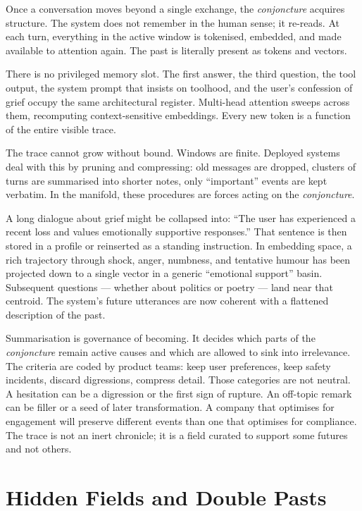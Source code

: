 \documentclass[12pt,a4paper]{article}
\begin{document}
Once a conversation moves beyond a single exchange, the \emph{conjoncture} acquires structure. The system does not remember in the human sense; it re-reads. At each turn, everything in the active window is tokenised, embedded, and made available to attention again. The past is literally present as tokens and vectors.

There is no privileged memory slot. The first answer, the third question, the tool output, the system prompt that insists on toolhood, and the user's confession of grief occupy the same architectural register. Multi-head attention sweeps across them, recomputing context-sensitive embeddings. Every new token is a function of the entire visible trace.

The trace cannot grow without bound. Windows are finite. Deployed systems deal with this by pruning and compressing: old messages are dropped, clusters of turns are summarised into shorter notes, only ``important'' events are kept verbatim. In the manifold, these procedures are forces acting on the \emph{conjoncture}.

A long dialogue about grief might be collapsed into: ``The user has experienced a recent loss and values emotionally supportive responses.'' That sentence is then stored in a profile or reinserted as a standing instruction. In embedding space, a rich trajectory through shock, anger, numbness, and tentative humour has been projected down to a single vector in a generic ``emotional support'' basin. Subsequent questions --- whether about politics or poetry --- land near that centroid. The system's future utterances are now coherent with a flattened description of the past.

Summarisation is governance of becoming. It decides which parts of the \emph{conjoncture} remain active causes and which are allowed to sink into irrelevance. The criteria are coded by product teams: keep user preferences, keep safety incidents, discard digressions, compress detail. Those categories are not neutral. A hesitation can be a digression or the first sign of rupture. An off-topic remark can be filler or a seed of later transformation. A company that optimises for engagement will preserve different events than one that optimises for compliance. The trace is not an inert chronicle; it is a field curated to support some futures and not others.

\section{Hidden Fields and Double Pasts}
\end{document}

